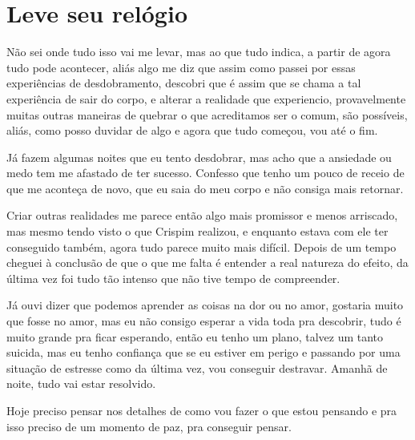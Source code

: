 
\chapter{Leve seu relógio}


Não sei onde tudo isso vai me levar, mas ao que tudo indica, a partir de agora tudo pode acontecer, aliás algo me diz que assim como passei por essas experiências de desdobramento, descobri que é assim que se chama a tal experiência de sair do corpo, e alterar a realidade que experiencio, provavelmente muitas outras maneiras de quebrar o que acreditamos ser o comum, são possíveis, aliás, como posso duvidar de algo e agora que tudo começou, vou até o fim.

Já fazem algumas noites que eu tento desdobrar, mas acho que a ansiedade ou medo tem me afastado de ter sucesso. Confesso que tenho um pouco de receio de que me aconteça de novo, que eu saia do meu corpo e não consiga mais retornar. 

Criar outras realidades me parece então algo mais promissor e menos arriscado, mas mesmo tendo visto o que Crispim realizou, e enquanto estava com ele ter conseguido também, agora tudo parece muito mais difícil. Depois de um tempo cheguei à conclusão de que o que me falta é entender a real natureza do efeito, da última vez foi tudo tão intenso que não tive tempo de compreender.

Já ouvi dizer que podemos aprender as coisas na dor ou no amor, gostaria muito que fosse no amor, mas eu não consigo esperar a vida toda pra descobrir, tudo é muito grande pra ficar esperando, então eu tenho um plano, talvez um tanto suicida, mas eu tenho confiança que se eu estiver em perigo e passando por uma situação de estresse como da última vez, vou conseguir destravar. Amanhã de noite, tudo vai estar resolvido.

Hoje preciso pensar nos detalhes de como vou fazer o que estou pensando e pra isso preciso de um momento de paz, pra conseguir pensar.

